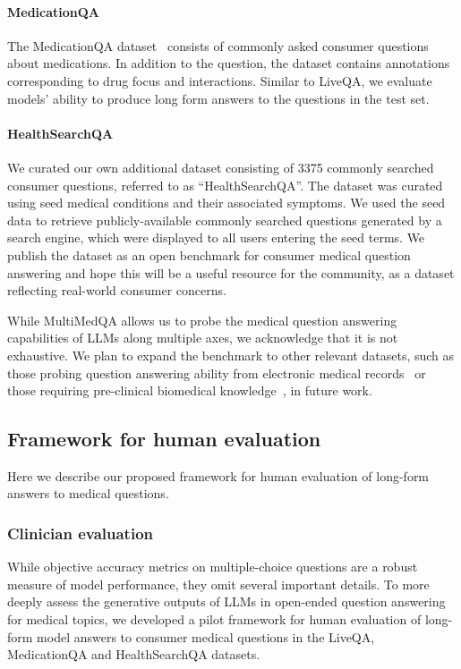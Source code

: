 \paragraph{MedicationQA} The MedicationQA dataset~\cite{abacha2019bridging} consists of commonly asked consumer questions about medications. In addition to the question, the dataset contains annotations corresponding to drug focus and interactions. Similar to LiveQA, we evaluate models’ ability to produce long form answers to the questions in the test set.

\paragraph{HealthSearchQA} We curated our own additional dataset consisting of 3375 commonly searched consumer questions, referred to as ``HealthSearchQA''. The dataset was curated using seed medical conditions and their associated symptoms.  We used the seed data to retrieve publicly-available commonly searched questions generated by a search engine, which were displayed to all users entering the seed terms. We publish the dataset as an open benchmark for consumer medical question answering and hope this will be a useful resource for the community, as a dataset reflecting real-world consumer concerns. 

While MultiMedQA allows us to probe the medical question answering capabilities of LLMs along multiple axes, we acknowledge that it is not exhaustive. We plan to expand the benchmark to other relevant datasets, such as those probing question answering ability from electronic medical records~\cite{pampari2018emrqa} or those requiring pre-clinical biomedical knowledge~\cite{tsatsaronis2015overview}, in future work.

\subsection{Framework for human evaluation}
\label{sec:framework-for-human-eval}

Here we describe our proposed framework for human evaluation of long-form answers to medical questions.

\label{sec:human_eval}
\subsubsection{Clinician evaluation} While objective accuracy metrics on multiple-choice questions are a robust measure of model performance, they omit several important details. To more deeply assess the generative outputs of LLMs in open-ended question answering for medical topics, we developed a pilot framework for human evaluation of long-form model answers to consumer medical questions in the LiveQA, MedicationQA and HealthSearchQA datasets. 


